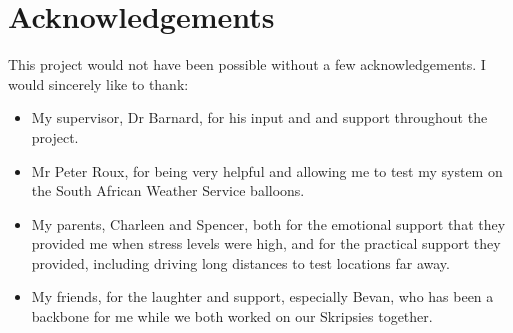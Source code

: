 \chapter*{Acknowledgements}
\makeatletter{}\makeatother

This project would not have been possible without a few acknowledgements. I would sincerely like to thank:
\begin{itemize}
    \item My supervisor, Dr Barnard, for his input and and support throughout the project.
    \item Mr Peter Roux, for being very helpful and allowing me to test my system on the South African Weather Service balloons.
    \item My parents, Charleen and Spencer, both for the emotional support that they provided me when stress levels were high, and for the practical support they provided, including driving long distances to test locations far away.
    \item My friends, for the laughter and support, especially Bevan, who has been a backbone for me while we both worked on our Skripsies together.
\end{itemize}